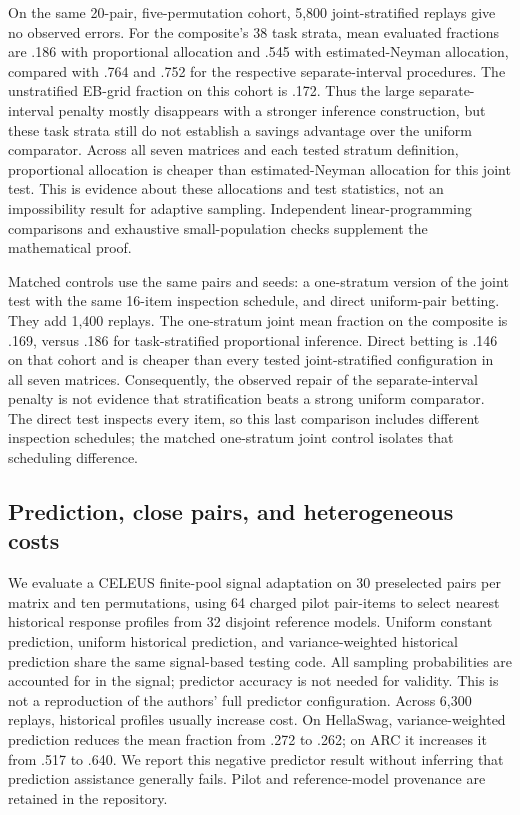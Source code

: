 On the same 20-pair, five-permutation cohort, 5,800 joint-stratified replays give no observed errors. For the composite's 38 task strata, mean evaluated fractions are .186 with proportional allocation and .545 with estimated-Neyman allocation, compared with .764 and .752 for the respective separate-interval procedures. The unstratified EB-grid fraction on this cohort is .172. Thus the large separate-interval penalty mostly disappears with a stronger inference construction, but these task strata still do not establish a savings advantage over the uniform comparator. Across all seven matrices and each tested stratum definition, proportional allocation is cheaper than estimated-Neyman allocation for this joint test. This is evidence about these allocations and test statistics, not an impossibility result for adaptive sampling. Independent linear-programming comparisons and exhaustive small-population checks supplement the mathematical proof.

Matched controls use the same pairs and seeds: a one-stratum version of the joint test with the same 16-item inspection schedule, and direct uniform-pair betting. They add 1,400 replays. The one-stratum joint mean fraction on the composite is .169, versus .186 for task-stratified proportional inference. Direct betting is .146 on that cohort and is cheaper than every tested joint-stratified configuration in all seven matrices. Consequently, the observed repair of the separate-interval penalty is not evidence that stratification beats a strong uniform comparator. The direct test inspects every item, so this last comparison includes different inspection schedules; the matched one-stratum joint control isolates that scheduling difference.

\subsection{Prediction, close pairs, and heterogeneous costs}\label{app:prediction}\label{prediction-close-pairs-and-heterogeneous-costs}

We evaluate a CELEUS finite-pool signal adaptation on 30 preselected pairs per matrix and ten permutations, using 64 charged pilot pair-items to select nearest historical response profiles from 32 disjoint reference models. Uniform constant prediction, uniform historical prediction, and variance-weighted historical prediction share the same signal-based testing code. All sampling probabilities are accounted for in the signal; predictor accuracy is not needed for validity. This is not a reproduction of the authors' full predictor configuration. Across 6,300 replays, historical profiles usually increase cost. On HellaSwag, variance-weighted prediction reduces the mean fraction from .272 to .262; on ARC it increases it from .517 to .640. We report this negative predictor result without inferring that prediction assistance generally fails. Pilot and reference-model provenance are retained in the repository.

